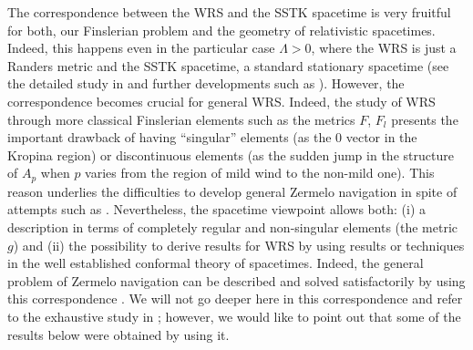 \documentclass[reqno,10pt]{amsart}
\begin{document}
The correspondence between the WRS and the SSTK spacetime is very fruitful for both, our Finslerian problem  and the geometry of relativistic spacetimes. Indeed, this happens even in the particular case $\Lambda>0$, where  the WRS is just a Randers metric and the SSTK spacetime, a standard stationary spacetime (see the detailed study in \cite{CJS} and further developments such as \cite{FHS,JLP15}). 
However, the correspondence becomes crucial for general WRS.  Indeed, the study of WRS through more classical Finslerian elements such as the metrics $F$, $F_l$ presents the important drawback of having ``singular'' elements (as the 0 vector 
in the Kropina region) or discontinuous elements (as the sudden jump in the structure of $A_p$ when $p$ varies from the region of mild wind to the non-mild one). This reason underlies the difficulties to develop general Zermelo navigation in spite of attempts such as \cite{Caratheodory}. 
Nevertheless, the spacetime viewpoint allows both: (i) a description in terms of completely regular and non-singular elements (the  metric $g$) and (ii) the possibility to derive results for WRS by using   results or techniques in the well established conformal theory of spacetimes. Indeed,  the general problem of Zermelo navigation can be described and solved satisfactorily by using this correspondence  \cite{CJSwind}. We will not go deeper here in this correspondence and refer to the exhaustive study in \cite{CJSwind}; however, we would like to point out that some of the results  below were obtained by using it.
\end{document}
